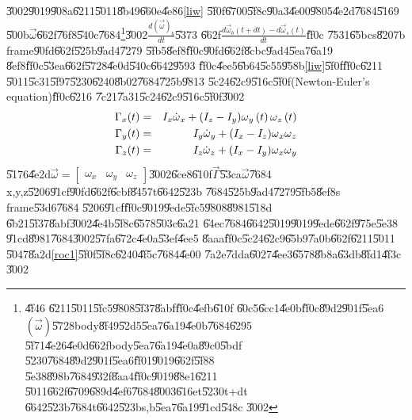\documentclass[12pt,a4paper]{article}
\begin{document}
\U{3002}\U{9019}\U{908a}\U{6211}\U{5011}\U{8b49}\U{660e}\U{4e86}\ref{liw}%
\U{5f0f}\U{6700}\U{5f8c}\U{90a3}\U{4e00}\U{9805}\U{4e2d}\U{7684}\U{5169}%
\U{500b}$\vec{\omega}$\U{662f}\U{76f8}\U{540c}\U{7684}\footnote{\U{4f46}%
\U{6211}\U{5011}\U{5fc5}\U{9808}\U{5f37}\U{8abf}\U{ff0c}\U{4efb}\U{610f}%
\U{60c5}\U{6cc1}\U{4e0b}\U{ff0c}\U{89d2}\U{901f}\U{5ea6}$\left( \vec{\omega}%
\right) $\U{5728}body\U{8f49}\U{52d5}\U{5ea7}\U{6a19}\U{4e0b}\U{7684}\U{6295}%
\U{5f71}\U{4e26}\U{4e0d}\U{662f}body\U{5ea7}\U{6a19}\U{4e0a}\U{89c0}\U{5bdf}%
\U{5230}\U{7684}\U{89d2}\U{901f}\U{5ea6}\U{ff01}\U{9019}\U{662f}\U{5f88}%
\U{5e38}\U{898b}\U{7684}\U{932f}\U{8aa4}\U{ff0c}\U{9019}\U{88e1}\U{6211}%
\U{5011}\U{662f}\U{6709}\U{689d}\U{4ef6}\U{7684}\U{8003}\U{616e}t\U{5230}t+dt%
\U{6642}\U{523b}\U{7684}t\U{6642}\U{523b}s,b\U{5ea7}\U{6a19}\U{91cd}\U{548c}%
\U{3002}}\U{3002}$\frac{d\left( \vec{\omega}\right) _{b}}{dt}$\U{5373}%
\U{662f}$\frac{d\vec{\omega}_{b}(t+dt)-d\vec{\omega}_{s}(t)}{dt}$\U{ff0c}%
\U{7531}\U{65bc}s\U{8207}b frame\U{90fd}\U{662f}\U{525b}\U{9ad4}\U{7279}%
\U{5fb5}\U{8ef8}\U{ff0c}\U{90fd}\U{662f}\U{8cbc}\U{9ad4}\U{5ea7}\U{6a19}%
\U{8ef8}\U{ff0c}\U{53ea}\U{662f}\U{5728}\U{4e0d}\U{540c}\U{6642}\U{9593}%
\U{ff0c}\U{4ee5}\U{6b64}\U{5c55}\U{958b}\ref{liw}\U{5f0f}\U{ff0c}\U{6211}%
\U{5011}\U{5c31}\U{5f97}\U{5230}\U{6240}\U{8b02}\U{7684}\U{725b}\U{9813}%
\U{5c24}\U{62c9}\U{516c}\U{5f0f}(Newton-Euler's equation)\U{ff0c}\U{6216}%
\U{7c21}\U{7a31}\U{5c24}\U{62c9}\U{516c}\U{5f0f}\U{3002}%
\begin{eqnarray}
\Gamma _{x}(t) &=&I_{x}\dot{\omega}_{x}+(I_{z}-I_{y})\omega _{y}\left(
t\right) \omega _{z}\left( t\right)  \notag \\
\Gamma _{y}(t) &=&I_{y}\dot{\omega}_{y}+(I_{x}-I_{z})\omega _{x}\omega _{z}
\label{eulereqbody} \\
\Gamma _{z}(t) &=&I_{z}\dot{\omega}_{z}+(I_{x}-I_{y})\omega _{x}\omega _{y} 
\notag
\end{eqnarray}%
\U{5176}\U{4e2d}$\vec{\omega}=\left[ 
\begin{array}{ccc}
\omega _{x} & \omega _{y} & \omega _{z}%
\end{array}%
\right] $\U{3002}\U{6ce8}\U{610f}$\vec{\Gamma}$\U{53ca}$\vec{\omega}$\U{7684}%
x,y,z\U{5206}\U{91cf}\U{90fd}\U{662f}\U{6cbf}\U{8457}t\U{6642}\U{523b}%
\U{7684}\U{525b}\U{9ad4}\U{7279}\U{5fb5}\U{8ef8}s frame\U{53d6}\U{7684}%
\U{5206}\U{91cf}\U{ff0c}\U{9019}\U{9ede}\U{5fc5}\U{9808}\U{8981}\U{518d}%
\U{6b21}\U{5f37}\U{8abf}\U{3002}\U{4e4b}\U{5f8c}\U{6578}\U{503c}\U{6a21}%
\U{64ec}\U{7684}\U{6642}\U{5019}\U{9019}\U{9ede}\U{662f}\U{975e}\U{5e38}%
\U{91cd}\U{8981}\U{7684}\U{3002}\U{57fa}\U{672c}\U{4e0a}\U{53ef}\U{4ee5}%
\U{8aaa}\U{ff0c}\U{5c24}\U{62c9}\U{65b9}\U{7a0b}\U{662f}\U{6211}\U{5011}%
\U{5047}\U{8a2d}\ref{roc1}\U{5f0f}\U{5f8c}\U{6240}\U{4f5c}\U{7684}\U{4e00}%
\U{7a2e}\U{7dda}\U{6027}\U{4ee3}\U{6578}\U{8b8a}\U{63db}\U{8fd1}\U{4f3c}%
\U{3002}
\end{document}
